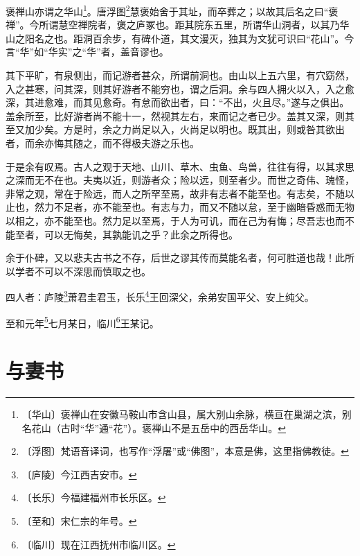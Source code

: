 \documentclass[12pt,UTF-8,openany]{ctexbook}
\begin{document}
\begin{normalsize}
    
    褒禅山亦谓之华山\footnote{〔华山〕褒禅山在安徽马鞍山市含山县，属大别山余脉，横亘在巢湖之滨，别名花山（古时“华”通“花”）。褒禅山不是五岳中的西岳华山。}。唐浮图\footnote{〔浮图〕梵语音译词，也写作“浮屠”或“佛图”，本意是佛，这里指佛教徒。}慧褒始舍于其址，而卒葬之；以故其后名之曰“褒禅”。今所谓慧空禅院者，褒之庐冢也。距其院东五里，所谓华山洞者，以其乃华山之阳名之也。距洞百余步，有碑仆道，其文漫灭，独其为文犹可识曰“花山”。今言“华”如“华实”之“华”者，盖音谬也。
    
    其下平旷，有泉侧出，而记游者甚众，所谓前洞也。由山以上五六里，有穴窈然，入之甚寒，问其深，则其好游者不能穷也，谓之后洞。余与四人拥火以入，入之愈深，其进愈难，而其见愈奇。有怠而欲出者，曰：“不出，火且尽。”遂与之俱出。盖余所至，比好游者尚不能十一，然视其左右，来而记之者已少。盖其又深，则其至又加少矣。方是时，余之力尚足以入，火尚足以明也。既其出，则或咎其欲出者，而余亦悔其随之，而不得极夫游之乐也。
    
    于是余有叹焉。古人之观于天地、山川、草木、虫鱼、鸟兽，往往有得，以其求思之深而无不在也。夫夷以近，则游者众；险以远，则至者少。而世之奇伟、瑰怪，非常之观，常在于险远，而人之所罕至焉，故非有志者不能至也。有志矣，不随以止也，然力不足者，亦不能至也。有志与力，而又不随以怠，至于幽暗昏惑而无物以相之，亦不能至也。然力足以至焉，于人为可讥，而在己为有悔；尽吾志也而不能至者，可以无悔矣，其孰能讥之乎？此余之所得也。
    
    余于仆碑，又以悲夫古书之不存，后世之谬其传而莫能名者，何可胜道也哉！此所以学者不可以不深思而慎取之也。
    
    四人者：庐陵\footnote{〔庐陵〕今江西吉安市。}萧君圭君玉，长乐\footnote{〔长乐〕今福建福州市长乐区。}王回深父，余弟安国平父、安上纯父。
    
    至和元年\footnote{〔至和〕宋仁宗的年号。}七月某日，临川\footnote{〔临川〕现在江西抚州市临川区。}王某记。
\end{normalsize}



\chapter{与妻书}
\end{document}
